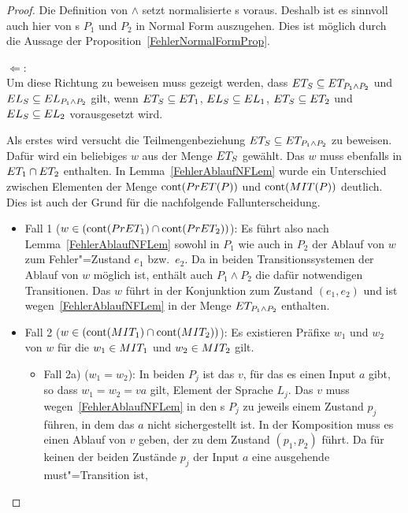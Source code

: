 \begin{proof}
  Die Definition von $\land$ setzt normalisierte \MEIO{}s voraus. Deshalb ist
  es sinnvoll auch hier von \MEIO{}s $P_1$ und $P_2$ in Normal Form auszugehen.
  Dies ist möglich durch die Aussage der Proposition~\ref{FehlerNormalFormProp}.

  \glqq $\Leftarrow$\grqq{}:\\
  Um diese Richtung zu beweisen muss gezeigt werden, dass $ET _S \subseteq ET
  _{P_1\land P_2}$ und $EL _S \subseteq EL _{P_1\land P_2}$ gilt, wenn $ET
  _S \subseteq ET _1$, $EL _S \subseteq EL _1$, $ET _S \subseteq ET _2$
  und $EL _S \subseteq EL _2$ vorausgesetzt wird.

  Als erstes wird versucht die Teilmengenbeziehung $ET _S \subseteq ET
  _{P_1\land P_2}$ zu beweisen. Dafür wird ein beliebiges $w$ aus der Menge
  $ET _S$ gewählt. Das $w$ muss ebenfalls in $ET _1\cap ET _2$ enthalten. In
  Lemma~\ref{FehlerAblaufNFLem} wurde ein Unterschied zwischen Elementen der Menge
  $\mathrm{cont} (PrET (P))$ und $\mathrm{cont} (MIT (P))$ deutlich. Dies ist auch der Grund
  für die nachfolgende Fallunterscheidung.
  \begin{itemize}
    \item Fall 1 ($w\in(\mathrm{cont} (PrET _1)\cap \mathrm{cont}(PrET _2))$): Es führt also
      nach Lemma~\ref{FehlerAblaufNFLem} sowohl in $P_1$ wie auch in $P_2$ der Ablauf
      von $w$ zum Fehler"=Zustand $e_1$ bzw.\ $e_2$. Da in beiden
      Transitionssystemen der Ablauf von $w$ möglich ist, enthält auch
      $P_1\land P_2$ die dafür notwendigen Transitionen. Das $w$ führt in der
      Konjunktion zum Zustand $(e_1,e_2)$ und ist wegen~\ref{FehlerAblaufNFLem} in
      der Menge $ET _{P_1\land P_2}$ enthalten.
    \item Fall 2 ($w\in(\mathrm{cont} (MIT _1)\cap \mathrm{cont} (MIT _2))$): Es existieren
      Präfixe $w_1$ und $w_2$ von $w$ für die $w_1\in MIT _1$ und $w_2\in MIT
      _2$ gilt.
      \begin{itemize}
        \item Fall 2a) ($w_1=w_2$): In beiden $P_j$ ist das $v$, für das es
          einen Input $a$ gibt, so dass $w_1 = w_2 = va$ gilt, Element der
          Sprache $L_j$. Das $v$ muss wegen~\ref{FehlerAblaufNFLem} in den \MEIO{}s
          $P_j$ zu jeweils einem Zustand $p_j$ führen, in dem das $a$ nicht
          sichergestellt ist. In der Komposition muss es einen Ablauf von $v$
          geben, der zu dem Zustand $(p_1,p_2)$ führt. Da für keinen der beiden
          Zustände $p_j$ der Input $a$ eine ausgehende must"=Transition ist,

\end{itemize}
\end{itemize}
\end{proof}
